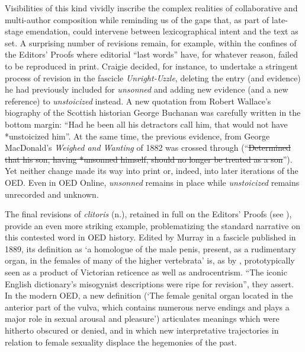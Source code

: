 \documentclass[output=paper,colorlinks,citecolor=brown,arabicfont,chinesefont]{langscibook}
\begin{document}
Visibilities of this kind vividly inscribe the complex realities of collaborative and multi-author composition while reminding us of the gaps that, as part of late-stage emendation, could intervene between lexicographical intent and the text as set. A surprising number of revisions remain, for example, within the confines of the Editors’ Proofs where editorial “last words” have, for whatever reason, failed to be reproduced in print. Craigie decided, for instance, to undertake a stringent process of revision in the fascicle \emph{Unright-Uzzle}, deleting the entry (and evidence) he had previously included for \emph{unsonned} and adding new evidence (and a new reference) to \emph{unstoicized} instead. A new quotation from Robert Wallace’s biography of the Scottish historian George Buchanan was carefully written in the bottom margin: “Had he been all his detractors call him, that would not have *unstoicized him”. At the same time, the previous evidence, from George MacDonald’s \emph{Weighed and Wanting} of 1882 was crossed through (“\sout{Determined that his son, having *unsonned himself, should no longer be treated as a son}”). Yet neither change made its way into print or, indeed, into later iterations of the OED. Even in OED Online, \emph{unsonned} remains in place while \emph{unstoicized} remains unrecorded and unknown.

The final revisions of \emph{clitoris} (n.), retained in full on the Editors’ Proofs (see ), provide an even more striking example, problematizing the standard narrative on this contested word in OED history. Edited by Murray in a fascicle published in 1889, its definition as `a homologue of the male penis, present, as a rudimentary organ, in the females of many of the higher vertebrata' is, as by \citet{Rees2019}, prototypically seen as a product of Victorian reticence as well as androcentrism. “The iconic English dictionary’s misogynist descriptions were ripe for revision”, they assert. In the modern OED, a new definition (`The female genital organ located in the anterior part of the vulva, which contains numerous nerve endings and plays a major role in sexual arousal and pleasure') articulates meanings which were hitherto obscured or denied, and in which new interpretative trajectories in relation to female sexuality displace the hegemonies of the past.
\end{document}
